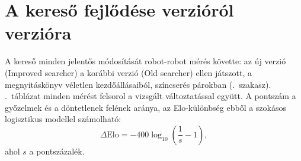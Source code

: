 \section{A kereső fejlődése verzióról verzióra}\label{sec:versions}

A kereső minden jelentős módosítását robot-robot mérés követte: az új verzió (Improved searcher) a korábbi verzió (Old searcher) ellen játszott, a megnyitáskönyv véletlen kezdőállásaiból, színcserés párokban (.~szakasz). .~táblázat minden mérést felsorol a vizsgált változtatással együtt. A pontszám a győzelmek és a döntetlenek felének aránya, az Elo-különbség ebből a szokásos logisztikus modellel számolható:
\begin{equation}
	\Delta\mathrm{Elo} = -400 \log_{10}\!\left(\frac{1}{s}-1\right),
\end{equation}
ahol $s$ a pontszázalék.

